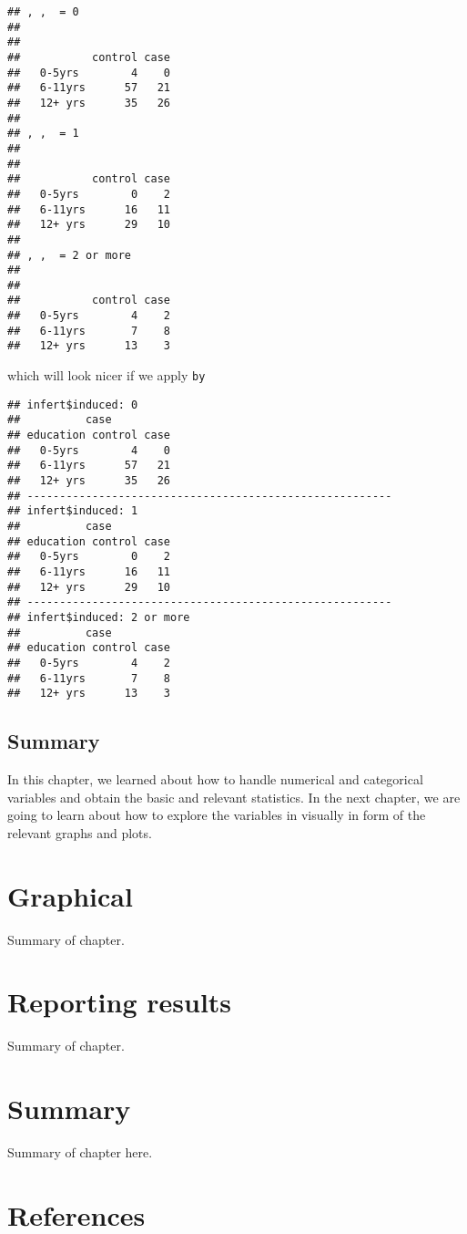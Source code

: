 \documentclass[]{book}
\newenvironment{Shaded}{\begin{snugshade}}{\end{snugshade}}
\newcommand{\KeywordTok}[1]{\textcolor[rgb]{0.13,0.29,0.53}{\textbf{{#1}}}}
\newcommand{\StringTok}[1]{\textcolor[rgb]{0.31,0.60,0.02}{{#1}}}
\newcommand{\NormalTok}[1]{{#1}}
\theoremstyle{definition}
\theoremstyle{definition}
\theoremstyle{remark}
\begin{document}
\begin{verbatim}
## , ,  = 0
## 
##          
##           control case
##   0-5yrs        4    0
##   6-11yrs      57   21
##   12+ yrs      35   26
## 
## , ,  = 1
## 
##          
##           control case
##   0-5yrs        0    2
##   6-11yrs      16   11
##   12+ yrs      29   10
## 
## , ,  = 2 or more
## 
##          
##           control case
##   0-5yrs        4    2
##   6-11yrs       7    8
##   12+ yrs      13    3
\end{verbatim}

which will look nicer if we apply \texttt{by}

\begin{Shaded}
\end{Shaded}

\begin{verbatim}
## infert$induced: 0
##          case
## education control case
##   0-5yrs        4    0
##   6-11yrs      57   21
##   12+ yrs      35   26
## -------------------------------------------------------- 
## infert$induced: 1
##          case
## education control case
##   0-5yrs        0    2
##   6-11yrs      16   11
##   12+ yrs      29   10
## -------------------------------------------------------- 
## infert$induced: 2 or more
##          case
## education control case
##   0-5yrs        4    2
##   6-11yrs       7    8
##   12+ yrs      13    3
\end{verbatim}

\section{Summary}\label{summary}

In this chapter, we learned about how to handle numerical and
categorical variables and obtain the basic and relevant statistics. In
the next chapter, we are going to learn about how to explore the
variables in visually in form of the relevant graphs and plots.

\chapter{Graphical}\label{graphical}

Summary of chapter.

\chapter{Reporting results}\label{reporting-results}

Summary of chapter.

\chapter{Summary}\label{summary-1}

Summary of chapter here.

\chapter{References}\label{references}
\end{document}
